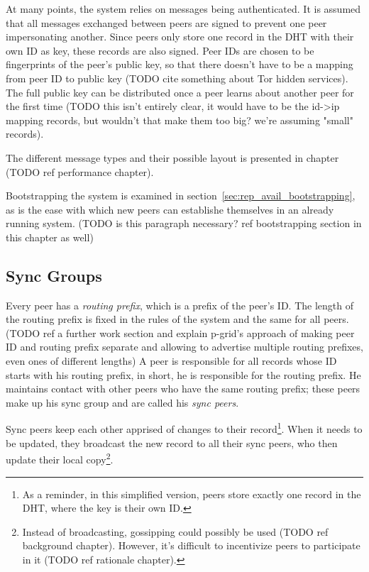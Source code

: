 At many points, the system relies on messages being authenticated. It is assumed
that all messages exchanged between peers are signed to prevent one peer
impersonating another. Since peers only store one record in the \ac{DHT} with
their own ID as key, these records are also signed. Peer IDs are chosen to be
fingerprints of the peer's public key, so that there doesn't have to be a
mapping from peer ID to public key (TODO cite something about Tor hidden
services). The full public key can be distributed once a peer learns about
another peer for the first time (TODO this isn't entirely clear, it would have
to be the id->ip mapping records, but wouldn't that make them too big? we're
assuming "small" records).

The different message types and their possible layout is presented in chapter
(TODO ref performance chapter).

Bootstrapping the system is examined in
section~\ref{sec:rep_avail_bootstrapping}, as is the ease with which new peers
can establishe themselves in an already running system. (TODO is this paragraph
necessary? ref bootstrapping section in this chapter as well)

\subsection{Sync Groups}
\label{sec:desc_sync_groups}
Every peer has a \emph{routing prefix}, which is a prefix of the peer's ID. The
length of the routing prefix is fixed in the rules of the system and the same
for all peers. (TODO ref a further work section and explain p-grid's approach of
making peer ID and routing prefix separate and allowing to advertise multiple
routing prefixes, even ones of different lengths) A peer is responsible for all
records whose ID starts with his routing prefix, in short, he is responsible for
the routing prefix. He maintains contact with other peers who have the same
routing prefix; these peers make up his sync group and are called his \emph{sync
peers}.

Sync peers keep each other apprised of changes to their record\footnote{As a
reminder, in this simplified version, peers store exactly one record in the
\ac{DHT}, where the key is their own ID.}. When it needs to be updated, they
broadcast the new record to all their sync peers, who then update their local
copy\footnote{Instead of broadcasting, gossipping could possibly be used (TODO
ref background chapter). However, it's difficult to incentivize peers to
participate in it (TODO ref rationale chapter).}.

